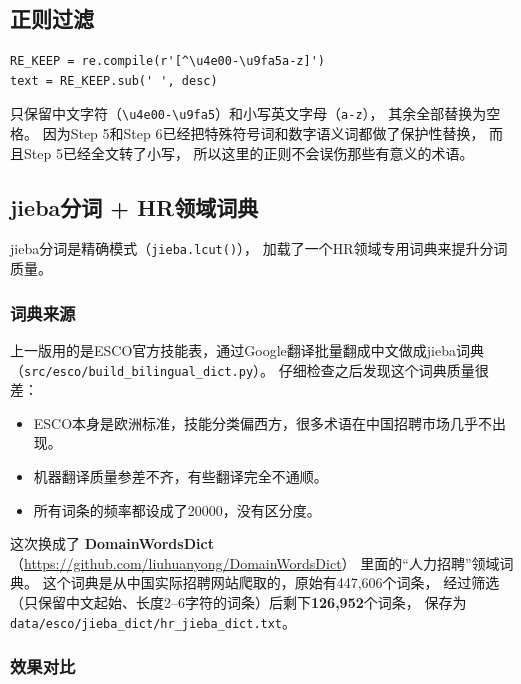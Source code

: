 \documentclass[12pt,a4paper]{ctexart}
\begin{document}
\subsection{正则过滤}

\begin{verbatim}
RE_KEEP = re.compile(r'[^\u4e00-\u9fa5a-z]')
text = RE_KEEP.sub(' ', desc)
\end{verbatim}

只保留中文字符（\texttt{\textbackslash u4e00-\textbackslash u9fa5}）和小写英文字母（\texttt{a-z}），
其余全部替换为空格。
因为Step 5和Step 6已经把特殊符号词和数字语义词都做了保护性替换，
而且Step 5已经全文转了小写，
所以这里的正则不会误伤那些有意义的术语。

\subsection{jieba分词 + HR领域词典}

jieba分词是精确模式（\texttt{jieba.lcut()}），
加载了一个HR领域专用词典来提升分词质量。

\subsubsection{词典来源}

上一版用的是ESCO官方技能表，通过Google翻译批量翻成中文做成jieba词典
（\texttt{src/esco/build\_bilingual\_dict.py}）。
仔细检查之后发现这个词典质量很差：
\begin{itemize}
\item ESCO本身是欧洲标准，技能分类偏西方，很多术语在中国招聘市场几乎不出现。
\item 机器翻译质量参差不齐，有些翻译完全不通顺。
\item 所有词条的频率都设成了20000，没有区分度。
\end{itemize}

这次换成了 \textbf{DomainWordsDict}（\url{https://github.com/liuhuanyong/DomainWordsDict}）
里面的``人力招聘''领域词典。
这个词典是从中国实际招聘网站爬取的，原始有447,606个词条，
经过筛选（只保留中文起始、长度2--6字符的词条）后剩下\textbf{126,952}个词条，
保存为 \texttt{data/esco/jieba\_dict/hr\_jieba\_dict.txt}。

\subsubsection{效果对比}
\end{document}
